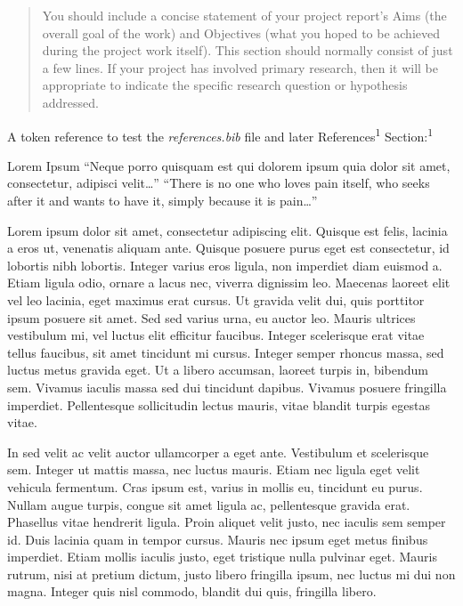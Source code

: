 \documentclass[
  11pt,
  a4paper,
]{scrreprt}
\begin{document}
\begin{quote}
You should include a concise statement of your project report's Aims
(the overall goal of the work) and Objectives (what you hoped to be
achieved during the project work itself). This section should normally
consist of just a few lines. If your project has involved primary
research, then it will be appropriate to indicate the specific research
question or hypothesis addressed.
\end{quote}

A token reference to test the \emph{references.bib} file and later
References\textsuperscript{1} Section:\textsuperscript{1}

Lorem Ipsum ``Neque porro quisquam est qui dolorem ipsum quia dolor sit
amet, consectetur, adipisci velit\ldots{}'' ``There is no one who loves
pain itself, who seeks after it and wants to have it, simply because it
is pain\ldots{}''

Lorem ipsum dolor sit amet, consectetur adipiscing elit. Quisque est
felis, lacinia a eros ut, venenatis aliquam ante. Quisque posuere purus
eget est consectetur, id lobortis nibh lobortis. Integer varius eros
ligula, non imperdiet diam euismod a. Etiam ligula odio, ornare a lacus
nec, viverra dignissim leo. Maecenas laoreet elit vel leo lacinia, eget
maximus erat cursus. Ut gravida velit dui, quis porttitor ipsum posuere
sit amet. Sed sed varius urna, eu auctor leo. Mauris ultrices vestibulum
mi, vel luctus elit efficitur faucibus. Integer scelerisque erat vitae
tellus faucibus, sit amet tincidunt mi cursus. Integer semper rhoncus
massa, sed luctus metus gravida eget. Ut a libero accumsan, laoreet
turpis in, bibendum sem. Vivamus iaculis massa sed dui tincidunt
dapibus. Vivamus posuere fringilla imperdiet. Pellentesque sollicitudin
lectus mauris, vitae blandit turpis egestas vitae.

In sed velit ac velit auctor ullamcorper a eget ante. Vestibulum et
scelerisque sem. Integer ut mattis massa, nec luctus mauris. Etiam nec
ligula eget velit vehicula fermentum. Cras ipsum est, varius in mollis
eu, tincidunt eu purus. Nullam augue turpis, congue sit amet ligula ac,
pellentesque gravida erat. Phasellus vitae hendrerit ligula. Proin
aliquet velit justo, nec iaculis sem semper id. Duis lacinia quam in
tempor cursus. Mauris nec ipsum eget metus finibus imperdiet. Etiam
mollis iaculis justo, eget tristique nulla pulvinar eget. Mauris rutrum,
nisi at pretium dictum, justo libero fringilla ipsum, nec luctus mi dui
non magna. Integer quis nisl commodo, blandit dui quis, fringilla
libero.
\end{document}
